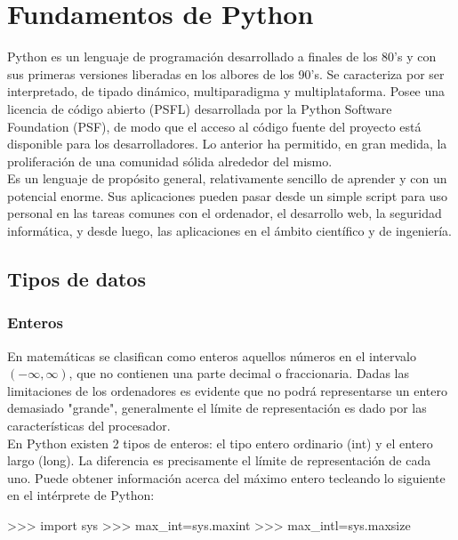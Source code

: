 \chapter{Fundamentos de Python}

Python es un lenguaje de programación desarrollado a finales de los 
80's y con sus primeras versiones liberadas en los albores de los 90's. Se caracteriza por ser interpretado, 
de tipado dinámico, multiparadigma y multiplataforma. Posee una licencia de código abierto (PSFL) 
desarrollada por la Python Software Foundation (PSF), de modo que el acceso al código fuente del proyecto 
está disponible para los desarrolladores. Lo anterior ha permitido, en gran medida, la proliferación 
de una comunidad sólida alrededor del mismo.\\

Es un lenguaje de propósito general, relativamente sencillo de aprender y con un potencial enorme. 
Sus aplicaciones pueden pasar desde un simple script para uso personal en las tareas comunes con 
el ordenador, el desarrollo web, la seguridad informática, y desde luego, las aplicaciones en el 
ámbito científico y de ingeniería.

\section{Tipos de datos}

\subsection{Enteros}

En matemáticas se clasifican como enteros aquellos números en el intervalo $ (-\infty,\infty) $, 
que no contienen una parte decimal o fraccionaria. Dadas las limitaciones de los ordenadores 
es evidente que no podrá representarse un entero demasiado "grande", generalmente el límite 
de representación es dado por las características del procesador.\\

En Python existen 2 tipos de enteros: el tipo entero ordinario (int) y el entero largo (long). 
La diferencia es precisamente el límite de representación de cada uno. Puede obtener información 
acerca del máximo entero tecleando lo siguiente en el intérprete de Python:

\begin{python}
	>>> import sys
	>>> max_int=sys.maxint
	>>> max_intl=sys.maxsize
\end{python}


